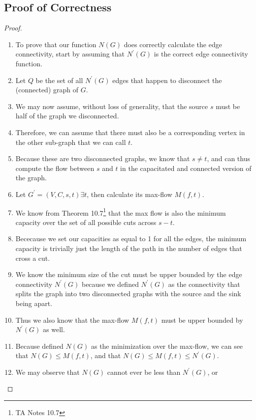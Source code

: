 \documentclass{article}
\begin{document}
\subsection{Proof of Correctness}
\begin{proof}
\begin{enumerate}
      \item  To prove that our function \(N(G)\) does correctly calculate the edge
      connectivity, start by assuming that \(N^{\prime}(G)\) is the correct edge
      connectivity function. 
      \item Let \(Q\) be the set of all \(N^\prime (G)\) edges that happen to disconnect
      the (connected) graph of \(G\).
      \item We may now assume, without loss of generality, that the source \(s\) must be
      half of the graph we disconnected. 
      \item Therefore, we can assume that there must also be a corresponding vertex in the
      other sub-graph that we can call \(t\). 
      \item Because these are two disconnected graphs, we know that \(s \neq t\), and can
      thus compute the flow between \(s\) and \(t\) in the capacitated and connected
      version of the graph. 
      \item Let \(G^\prime = (V, C, s, t) \exists t\), then calculate its max-flow
      \(M(f,t)\). 
      \item We know from Theorem 10.7\footnote{TA Notes 10.7 } that the max flow is also
      the minimum capacity over the set of all possible cuts across \(s-t\). 
      \item Bececause we set our capacities as equal to 1 for all the edges, the minimum
      capacity is trivially just the length of the path in the number of edges that cross
      a cut. 
      \item We know the minimum size of the cut must be upper bounded by the edge
      connectivity \(N^\prime (G)\) because we defined \(N^\prime(G)\) as the connectivity
      that splits the graph into two disconnected graphs with the source and the sink
      being apart. 
      \item Thus we also know that the max-flow \(M(f,t)\) must be upper bounded by
      \(N^\prime (G)\) as well. 
      \item Because defined \(N(G)\) as the minimization over the max-flow, we can see
      that \(N(G) \leq M(f,t)\), and that \(N(G) \leq M(f,t) \leq N^\prime (G)\).
      \item We may observe that \(N(G)\) cannot ever be less than \(N^\prime (G)\), or

\end{enumerate}
\end{proof}
\end{document}
